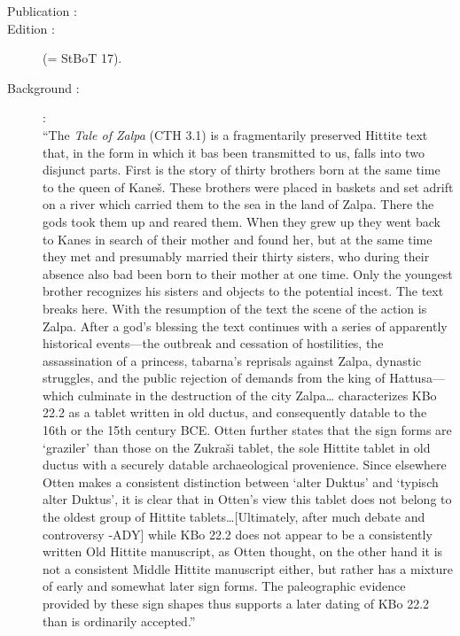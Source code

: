 \documentclass[10pt]{article}
\renewcommand{\.}[1]{\textsubdot{#1}}
\begin{document}
\begin{description}

\item[Publication :] 
\item[Edition :] \citet{otten1973zalpa} (= StBoT 17).  \\ 
\citet{holland2007zalpa}
\item[Background :] \citet{holland2007zalpa}: \\

``The \textit{Tale of Zalpa} (CTH 3.1) is a fragmentarily preserved Hittite text that, in the form in which it bas been transmitted to us, falls into two disjunct parts. First is the story of thirty brothers born at the same time to the queen of Kane\v{s}. These brothers were placed in baskets and set adrift on a river which carried them to the sea in the land of Zalpa. There the gods took them up and reared them. When they grew up they went back to Kanes in search of their mother and found her, but at the same time they met and presumably married their thirty sisters, who during their absence also bad been born to their mother at one time. Only the youngest brother recognizes his sisters and objects to the potential incest. The text breaks here. With the resumption of the text the scene of the action is Zalpa. After a god's blessing the text continues with a series of apparently historical events---the outbreak and cessation of hostilities, the assassination of a princess, tabarna's reprisals against Zalpa, dynastic struggles, and the public rejection of demands from the king of Hattusa---which culminate in the destruction of the city Zalpa{\ldots}\citet[1]{otten1973zalpa} characterizes KBo 22.2 as a tablet written in old ductus, and consequently datable to the 16th or the 15th century BCE. Otten further states that the sign forms are `graziler' than those on the Zukra\v{s}i tablet, the sole Hittite tablet in old ductus with a securely datable archaeological provenience. Since elsewhere Otten makes a consistent distinction between `alter Duktus' and `typisch alter Duktus', it is clear that in Otten's view this tablet does not belong to the oldest group of Hittite tablets{\ldots}[Ultimately, after much debate and controversy -ADY] while KBo 22.2 does not appear to be a consistently written Old Hittite manuscript, as Otten thought, on the other hand it is not a consistent Middle Hittite manuscript either, but rather has a mixture of early and somewhat later sign forms. The paleographic evidence provided by these sign shapes thus supports a later dating of KBo 22.2 than is ordinarily accepted.''


\end{description}
\end{document}
